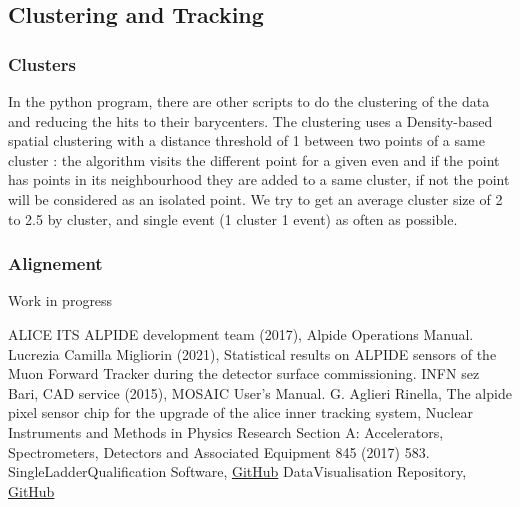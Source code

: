 \documentclass[12pt,oneside,a4]{article}
\begin{document}
    \subsection{Clustering and Tracking}
    \subsubsection{Clusters}
    In the python program, there are other scripts to do the clustering of the data and reducing the hits to their barycenters. 
    The clustering uses a Density-based spatial clustering with a distance threshold of 1 between two points of a same cluster : the algorithm visits the different point for a given even and if the point has points in its neighbourhood they are added to a same cluster, if not the point will be considered as an isolated point. 
    We try to get an average cluster size of 2 to 2.5 by cluster, and single event (1 cluster 1 event) as often as possible. 
    \subsubsection{Alignement}
    Work in progress
    


\newpage
\begin{thebibliography}{99}
ALICE ITS ALPIDE development team (2017), Alpide Operations Manual.
Lucrezia Camilla Migliorin (2021), Statistical results on ALPIDE sensors of the Muon Forward Tracker during the detector surface commissioning.
INFN sez Bari, CAD service (2015), MOSAIC User's Manual.
G. Aglieri Rinella, The alpide pixel sensor chip for the upgrade of the alice inner tracking system, Nuclear Instruments and Methods in Physics Research Section A: Accelerators, Spectrometers, Detectors and Associated Equipment 845 (2017) 583.
 SingleLadderQualification Software, \href{https://github.com/AudreyFrancisco/SingleLadderQualification}{GitHub}
 DataVisualisation Repository,  \href{https://github.com/fbossu/beam_test_2023/tree/Banco/banco}{GitHub}
\end{thebibliography}
\end{document}
